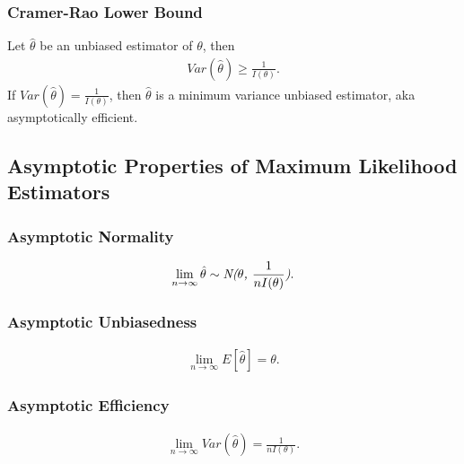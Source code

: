 \documentclass{article}
\begin{document}
\subsubsection{Cramer-Rao Lower Bound}
Let $\hat{\theta}$ be an unbiased estimator of $\theta$, then
\begin{align*}
    Var(\hat{\theta}) \ge \frac{1}{I(\theta)}.
\end{align*}
If $Var(\hat{\theta}) = \frac{1}{I(\theta)}$, then $\hat{\theta}$ is a minimum variance unbiased estimator, aka asymptotically efficient.

\subsection{Asymptotic Properties of Maximum Likelihood Estimators}
\subsubsection{Asymptotic Normality}
\begin{align*}
    \lim_{n\rightarrow\infty}\hat{\theta} \sim \emph{N($\theta$, $\frac{1}{nI(\theta)}$)}.
\end{align*}
\subsubsection{Asymptotic Unbiasedness}
\begin{align*}
    \lim_{n\rightarrow\infty}E[\hat{\theta}] = \theta.
\end{align*}
\subsubsection{Asymptotic Efficiency}
\begin{align*}
    \lim_{n\rightarrow\infty}Var(\hat{\theta}) = \frac{1}{nI(\theta)}.
\end{align*}
\end{document}
